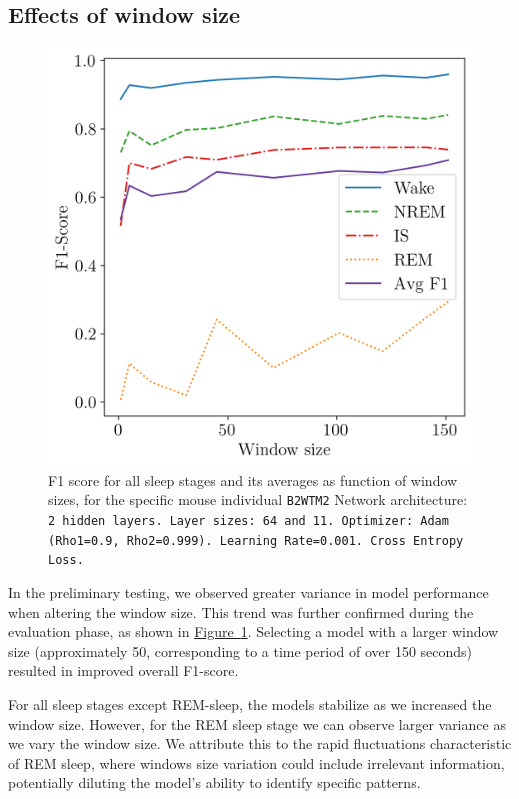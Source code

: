 \documentclass{article}
\begin{document}
\begin{multicols}{2}
\subsection*{Effects of window size}

\begin{figure}[H]
    \centering
    \includegraphics[width=\linewidth]{figures/1d_plot_f1_score_trial_8_mouse_b2wtm2.csv.png} 
    \caption{F1 score for all sleep stages and its averages as function of window sizes, for the specific mouse individual \texttt{B2WTM2} Network architecture: \texttt{2 hidden layers. Layer sizes: 64 and 11. Optimizer: Adam (Rho1=0.9, Rho2=0.999). Learning Rate=0.001. Cross Entropy Loss.}}
    \label{fig:window_size}
\end{figure}

In the preliminary testing, we observed greater variance in model performance when altering the window size. This trend was further confirmed during the evaluation phase, as shown in \hyperref[fig:window_size]{Figure~\ref*{fig:window_size}}. Selecting a model with a larger window size (approximately 50, corresponding to a time period of over 150 seconds) resulted in improved overall F1-score.

For all sleep stages except REM-sleep, the models stabilize as we increased the window size. However, for the REM sleep stage we can observe larger variance as we vary the window size. We attribute this to the rapid fluctuations characteristic of REM sleep, where windows size variation could include irrelevant information, potentially diluting the model's ability to identify specific patterns.


\end{multicols}
\end{document}
